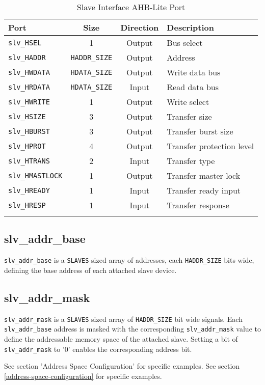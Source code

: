 \begin{longtable}[]{@{}lccl@{}}
\toprule
Port & Size & Direction & Description\tabularnewline
\midrule
\endhead
\texttt{slv\_HSEL}       & 1                    & Output & Bus select\tabularnewline
\texttt{slv\_HADDR}      & \texttt{HADDR\_SIZE} & Output & Address\tabularnewline
\texttt{slv\_HWDATA}     & \texttt{HDATA\_SIZE} & Output & Write data bus\tabularnewline
\texttt{slv\_HRDATA}     & \texttt{HDATA\_SIZE} & Input  & Read data bus\tabularnewline
\texttt{slv\_HWRITE}     & 1                    & Output & Write select\tabularnewline
\texttt{slv\_HSIZE}      & 3                    & Output & Transfer size\tabularnewline
\texttt{slv\_HBURST}     & 3                    & Output & Transfer burst size\tabularnewline
\texttt{slv\_HPROT}      & 4                    & Output & Transfer protection level\tabularnewline
\texttt{slv\_HTRANS}     & 2                    & Input  & Transfer type\tabularnewline
\texttt{slv\_HMASTLOCK}  & 1                    & Output & Transfer master lock\tabularnewline
\texttt{slv\_HREADY}     & 1                    & Input  & Transfer ready input\tabularnewline
\texttt{slv\_HRESP}      & 1                    & Input  & Transfer response\tabularnewline
\bottomrule
\caption{Slave Interface AHB-Lite Port}
\end{longtable}

\subsection{slv\_addr\_base}\label{slv_addr_base}

\texttt{slv\_addr\_base} is a \texttt{SLAVES} sized array of addresses, each
\texttt{HADDR\_SIZE} bits wide, defining the base address of each attached slave device.

\subsection{slv\_addr\_mask}\label{slv_addr_mask}
\texttt{slv\_addr\_mask} is a \texttt{SLAVES} sized array of \texttt{HADDR\_SIZE} bit wide
signals. Each \texttt{slv\_addr\_base} address is masked with the corresponding
\texttt{slv\_addr\_mask} value to define the addressable memory space of the attached slave.
Setting a bit of \texttt{slv\_addr\_mask} to '0' enables the corresponding address bit.

\ifdefined\MARKDOWN
  See section 'Address Space Configuration' for specific examples.
\else
  See section \ref{address-space-configuration} for specific examples.
\fi

